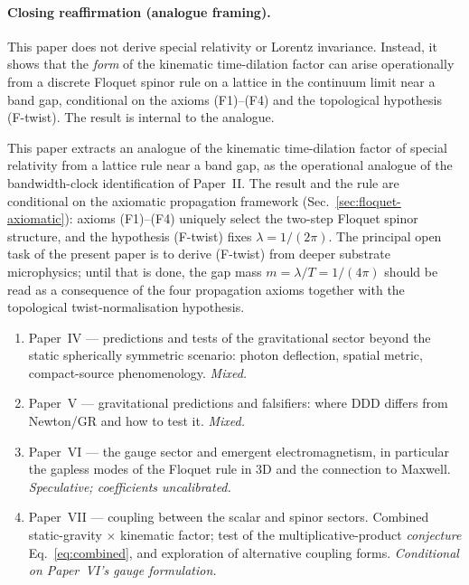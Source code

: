 \documentclass[11pt,a4paper]{article}
\begin{document}
\paragraph{Closing reaffirmation (analogue framing).}
This paper does not derive special relativity or Lorentz
invariance. Instead, it shows that the \emph{form} of the
kinematic time-dilation factor can arise operationally from a
discrete Floquet spinor rule on a lattice in the continuum
limit near a band gap, conditional on the axioms (F1)--(F4)
and the topological hypothesis (F-twist). The result is
internal to the analogue.

This paper extracts an analogue of the kinematic time-dilation factor of
special relativity from a lattice rule near a band gap, as the
operational analogue of the bandwidth-clock identification of
Paper~II. The result and the rule are conditional on the
axiomatic propagation framework
(Sec.~\ref{sec:floquet-axiomatic}): axioms (F1)--(F4) uniquely
select the two-step Floquet spinor structure, and the
hypothesis (F-twist) fixes $\lambda = 1/(2\pi)$. The principal
open task of the present paper is to derive (F-twist) from
deeper substrate microphysics; until that is done, the gap mass
$m = \lambda/T = 1/(4\pi)$ should be read as a consequence of
the four propagation axioms together with the topological
twist-normalisation hypothesis.

\begin{enumerate}
\item Paper~IV --- predictions and tests of the gravitational
sector beyond the static spherically symmetric scenario:
photon deflection, spatial metric, compact-source phenomenology.
\emph{Mixed.}
\item Paper~V --- gravitational predictions and falsifiers:
where DDD differs from Newton/GR and how to test it.
\emph{Mixed.}
\item Paper~VI --- the gauge sector and emergent
electromagnetism, in particular the gapless modes of the
Floquet rule in 3D and the connection to Maxwell.
\emph{Speculative; coefficients uncalibrated.}
\item Paper~VII --- coupling between the scalar and spinor
sectors. Combined static-gravity $\times$ kinematic factor;
test of the multiplicative-product \emph{conjecture}
Eq.~\eqref{eq:combined}, and exploration of alternative
coupling forms. \emph{Conditional on Paper~VI's gauge
formulation.}
\end{enumerate}
\end{document}
